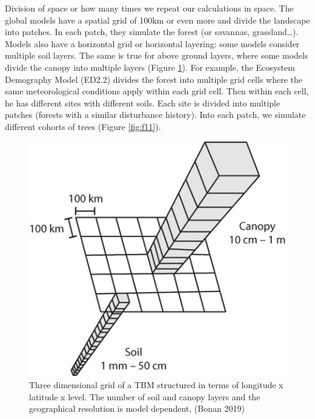 \documentclass[12pt,oneside]{book}
\begin{document}
Division of space or how many times we repeat our calculations in space.
The global models have a spatial grid of 100km or even more and divide
the landscape into patches. In each patch, they simulate the forest (or
savannas, grassland\ldots{}). Models also have a horizontal grid or
horizontal layering: some models consider multiple soil layers. The same
is true for above ground layers, where some models divide the canopy
into multiple layers (Figure \ref{fig:f10}). For example, the Ecosystem
Demography Model (ED2.2) divides the forest into multiple grid cells
where the same meteorological conditions apply within each grid cell.
Then within each cell, he has different sites with different soils. Each
site is divided into multiple patches (forests with a similar
disturbance history). Into each patch, we simulate different cohorts of
trees (Figure \ref{fig:f11}).

\begin{figure}

{\centering \includegraphics[width=0.8\linewidth]{figures/chap1/grid_vert_hor} 

}

\caption{Three dimensional grid of a TBM structured in terms of longitude x latitude x level. The number of soil and canopy layers and the geographical resolution is model dependent, (Bonan 2019)}\label{fig:f10}
\end{figure}
\end{document}

